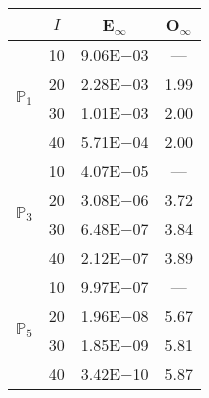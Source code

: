 \begin{table}[H]
\centering
\begin{tabular}{@{}l c c c@{}}
\toprule
 & $I$ & E$_{\infty}$ & O$_{\infty}$\\
\midrule
\multirow{4}{*}{$\mathbb{P}_{1}$}
 & 10 & 9.06E$-$03 & ---\\
 & 20 & 2.28E$-$03 & 1.99  \\
 & 30 & 1.01E$-$03 & 2.00  \\
 & 40 & 5.71E$-$04 & 2.00  \\
\midrule
\multirow{4}{*}{$\mathbb{P}_{3}$}
 & 10 & 4.07E$-$05 & ---\\
 & 20 & 3.08E$-$06 & 3.72  \\
 & 30 & 6.48E$-$07 & 3.84  \\
 & 40 & 2.12E$-$07 & 3.89  \\
\midrule
\multirow{4}{*}{$\mathbb{P}_{5}$}
 & 10 & 9.97E$-$07 & ---\\
 & 20 & 1.96E$-$08 & 5.67  \\
 & 30 & 1.85E$-$09 & 5.81  \\
 & 40 & 3.42E$-$10 & 5.87  \\
\bottomrule
\end{tabular}
\end{table}
